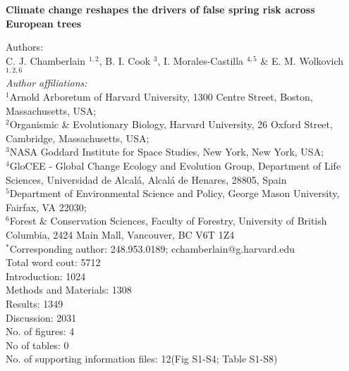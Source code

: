 \documentclass{article}\usepackage[]{graphicx}\usepackage[]{color}
\begin{document}
\noindent 
\textbf{\LARGE{Climate change reshapes the drivers of false spring risk across European trees}} 


\noindent Authors:\\
C. J. Chamberlain $^{1,2}$, B. I. Cook $^{3}$, I. Morales-Castilla $^{4,5}$ \& E. M. Wolkovich $^{1,2,6}$
\vspace{2ex}\\
\emph{Author affiliations:}\\
$^{1}$Arnold Arboretum of Harvard University, 1300 Centre Street, Boston, Massachusetts, USA; \\
$^{2}$Organismic \& Evolutionary Biology, Harvard University, 26 Oxford Street, Cambridge, Massachusetts, USA; \\
$^{3}$NASA Goddard Institute for Space Studies, New York, New York, USA; \\
$^{4}$GloCEE - Global Change Ecology and Evolution Group, Department of Life Sciences, Universidad de Alcal\'{a}, Alcal\'{a} de Henares, 28805, Spain \\
$^{5}$Department of Environmental Science and Policy, George Mason University, Fairfax, VA 22030; \\
$^{6}$Forest \& Conservation Sciences, Faculty of Forestry, University of British Columbia, 2424 Main Mall, Vancouver, BC V6T 1Z4\\
\vspace{2ex}
$^*$Corresponding author: 248.953.0189; cchamberlain@g.harvard.edu\\

Total word cout: 5712 \\
Introduction: 1024 \\
Methods and Materials: 1308\\
Results: 1349\\
Discussion: 2031 \\ %

No. of figures: 4\\
No of tables: 0 \\
No. of supporting information files: 12(Fig S1-S4; Table S1-S8)\\ 
\end{document}
